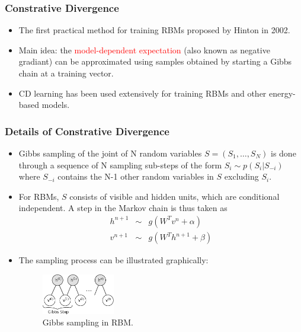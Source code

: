 \documentclass{beamer}
\newcommand{\tr}[1]{\textcolor{red}{#1}} %
\begin{document}

\begin{frame}
\frametitle{Constrative Divergence}
\begin{itemize}
\item The first practical method for training RBMs proposed by Hinton in 2002.
\item Main idea: the \tr{model-dependent expectation} (also known as negative gradiant) can be approximated using samples obtained by starting a Gibbs chain at a training vector.
\item CD learning has been used extensively for training RBMs and other energy-based models. 
\end{itemize}
\end{frame}

\begin{frame}
\frametitle{Details of Constrative Divergence}
\begin{itemize}
\item Gibbs sampling of the joint of N random variables $S=(S_1, \dots, S_N)$ is done through a sequence of N sampling sub-steps of the form $S_i \sim p(S_i|S_{-i})$ where $S_{-i}$ contains the N-1 other random variables in $S$ excluding $S_i$.
\item For RBMs, $S$ consists of visible and hidden units, which are conditional independent. A step in the Markov chain is thus taken as
\begin{eqnarray}
h^{n+1}&\sim& g(W^Tv^n+\alpha) \\
v^{n+1}&\sim & g(W^Th^{n+1}+\beta)
\end{eqnarray}
\item The sampling process can be illustrated graphically:
\begin{figure}
\centering
  \includegraphics[width=0.3\textwidth]{figs/markov_chain.png}
  \caption{Gibbs sampling in RBM.}
\end{figure}
\end{itemize}
\end{frame}

\end{document}
